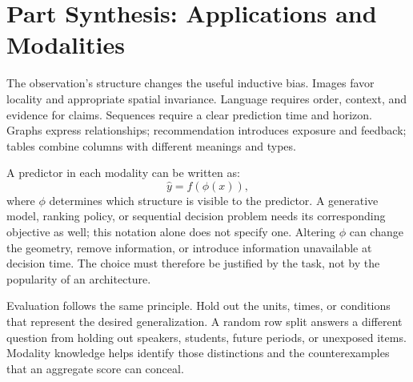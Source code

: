 \chapter*{Part Synthesis: Applications and Modalities}

The observation's structure changes the useful inductive bias. Images favor locality and appropriate spatial invariance. Language requires order, context, and evidence for claims. Sequences require a clear prediction time and horizon. Graphs express relationships; recommendation introduces exposure and feedback; tables combine columns with different meanings and types.

A predictor in each modality can be written as:
\[
\hat y=f(\phi(x)),
\]
where $\phi$ determines which structure is visible to the predictor. A generative model, ranking policy, or sequential decision problem needs its corresponding objective as well; this notation alone does not specify one. Altering $\phi$ can change the geometry, remove information, or introduce information unavailable at decision time. The choice must therefore be justified by the task, not by the popularity of an architecture.

Evaluation follows the same principle. Hold out the units, times, or conditions that represent the desired generalization. A random row split answers a different question from holding out speakers, students, future periods, or unexposed items. Modality knowledge helps identify those distinctions and the counterexamples that an aggregate score can conceal.

\clearpage
{\pagestyle{empty}\cleardoublepage}
